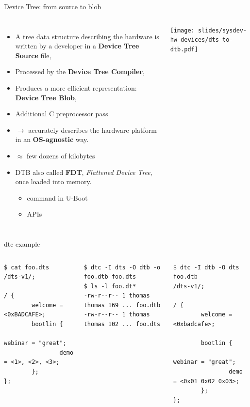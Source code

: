 \begin{frame}{Device Tree: from source to blob}
  \begin{columns}
    \begin{itemize}
    \item A tree data structure describing the hardware is written by a
      developer in a {\bf Device Tree Source} file, 
    \item Processed by the {\bf Device Tree Compiler}, 
    \item Produces a more efficient representation: {\bf Device Tree
        Blob}, 
    \item Additional C preprocessor pass
    \item {} $\rightarrow$ accurately describes the hardware platform in an {\bf OS-agnostic} way.
    \item {} $\approx$ few dozens of kilobytes
    \item DTB also called {\bf FDT}, {\em Flattened Device Tree}, once
      loaded into memory.
      \begin{itemize}
      \item {} command in U-Boot
      \item {} APIs
      \end{itemize}
    \end{itemize}
    \texttt{[image: slides/sysdev-hw-devices/dts-to-dtb.pdf]}
  \end{columns}
\end{frame}

\begin{frame}[fragile]{dtc example}
  \footnotesize
  \begin{columns}[t]
    \begin{block}{}
\begin{verbatim}
$ cat foo.dts
/dts-v1/;

/ {
        welcome = <0xBADCAFE>;
        bootlin {
                webinar = "great";
                demo = <1>, <2>, <3>;
        };
};
\end{verbatim}
    \end{block}
    \pause
    \begin{block}{}
\begin{verbatim}
$ dtc -I dts -O dtb -o foo.dtb foo.dts
$ ls -l foo.dt*
-rw-r--r-- 1 thomas thomas 169 ... foo.dtb
-rw-r--r-- 1 thomas thomas 102 ... foo.dts
\end{verbatim}
    \end{block}
    \pause
    \begin{block}{}
\begin{verbatim}
$ dtc -I dtb -O dts foo.dtb
/dts-v1/;

/ {
        welcome = <0xbadcafe>;

        bootlin {
                webinar = "great";
                demo = <0x01 0x02 0x03>;
        };
};
\end{verbatim}
    \end{block}
  \end{columns}
\end{frame}

